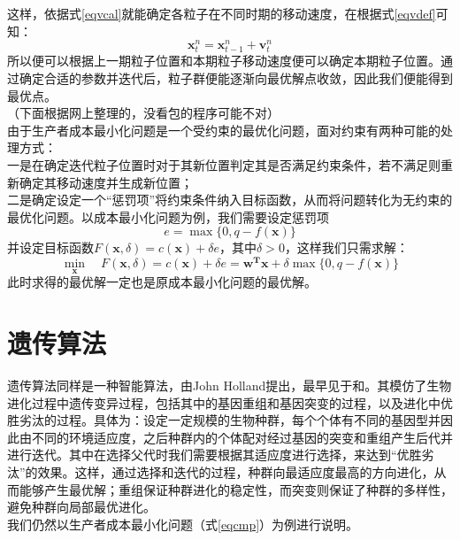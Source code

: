 \documentclass[11pt,a4paper]{article}
\begin{document}
这样，依据式\ref{eqvcal}就能确定各粒子在不同时期的移动速度，在根据式\ref{eqvdef}可知：
\begin{equation}
    \mathbf{x}^n_{t}=\mathbf{x}^n_{t-1}+\mathbf{v}^n_{t}
\end{equation}
所以便可以根据上一期粒子位置和本期粒子移动速度便可以确定本期粒子位置。通过确定合适的参数并迭代后，粒子群便能逐渐向最优解点收敛，因此我们便能得到最优点。\\

（下面根据网上整理的，没看包的程序可能不对）\\

由于生产者成本最小化问题是一个受约束的最优化问题，面对约束有两种可能的处理方式：\\

一是在确定迭代粒子位置时对于其新位置判定其是否满足约束条件，若不满足则重新确定其移动速度并生成新位置；\\

二是确定设定一个“惩罚项”将约束条件纳入目标函数，从而将问题转化为无约束的最优化问题。以成本最小化问题为例，我们需要设定惩罚项
\begin{equation}
    e=\max\{0,q-f(\mathbf{x})\}
\end{equation}
并设定目标函数$F(\mathbf{x},\delta)=c(\mathbf{x})+\delta e$，其中$\delta >0$，这样我们只需求解：
\begin{equation}
	\min_{\mathbf{x}} \quad F(\mathbf{x},\delta)=c(\mathbf{x})+\delta e=\mathbf{w^T x}+\delta \max\{0,q-f(\mathbf{x})\}
\end{equation}
此时求得的最优解一定也是原成本最小化问题的最优解。

\section{遗传算法}

遗传算法同样是一种智能算法，由John Holland提出，最早见于\textcite{RN5873}和\textcite{RN5874}。其模仿了生物进化过程中遗传变异过程，包括其中的基因重组和基因突变的过程，以及进化中优胜劣汰的过程。具体为：设定一定规模的生物种群，每个个体有不同的基因型并因此由不同的环境适应度，之后种群内的个体配对经过基因的突变和重组产生后代并进行迭代。其中在选择父代时我们需要根据其适应度进行选择，来达到“优胜劣汰”的效果。这样，通过选择和迭代的过程，种群向最适应度最高的方向进化，从而能够产生最优解；重组保证种群进化的稳定性，而突变则保证了种群的多样性，避免种群向局部最优进化。\\

我们仍然以生产者成本最小化问题（式\ref{eqcmp}）为例进行说明。\\
\end{document}
